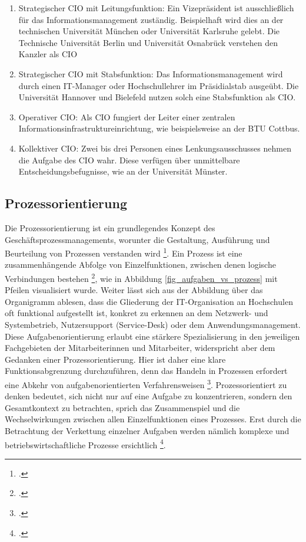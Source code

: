 \begin{enumerate}
    \item Strategischer CIO mit Leitungsfunktion: Ein Vizepräsident ist ausschließlich für das Informationsmanagement zuständig. Beispielhaft wird dies an der technischen Universität München oder Universität Karlsruhe gelebt. Die Technische Universität Berlin und Universität Osnabrück verstehen den Kanzler als CIO
    \item Strategischer CIO mit Stabsfunktion: Das Informationsmanagement wird durch einen IT-Manager oder Hochschullehrer im Präsidialstab ausgeübt. Die Universität Hannover und Bielefeld nutzen solch eine Stabsfunktion als CIO.
    \item Operativer CIO: Als CIO fungiert der Leiter einer zentralen Informationsinfrastruktureinrichtung, wie beispielsweise an der BTU Cottbus.
    \item Kollektiver CIO: Zwei bis drei Personen eines Lenkungsausschusses nehmen die Aufgabe des CIO wahr. Diese verfügen über unmittelbare Entscheidungsbefugnisse, wie an der Universität Münster.
\end{enumerate}


\subsection{Prozessorientierung}
\label{subsection_prozessorientierung}
Die Prozessorientierung ist ein grundlegendes Konzept des Geschäftsprozessmanagements, worunter die Gestaltung, Ausführung und Beurteilung von Prozessen verstanden wird \footcite{Zitat fehlt}. Ein Prozess ist eine zusammenhängende Abfolge von Einzelfunktionen, zwischen denen logische Verbindungen bestehen \footcite{Zitat fehlt}, wie in Abbildung \ref{fig_aufgaben_vs_prozess} mit Pfeilen visualisiert wurde. Weiter lässt sich aus der Abbildung über das Organigramm ablesen, dass die Gliederung der IT-Organisation an Hochschulen oft funktional aufgestellt ist, konkret zu erkennen an dem Netzwerk- und Systembetrieb, Nutzersupport (Service-Desk) oder dem Anwendungsmanagement. Diese Aufgabenorientierung erlaubt eine stärkere Spezialisierung in den jeweiligen Fachgebieten der Mitarbeiterinnen und Mitarbeiter, widerspricht aber dem Gedanken einer Prozessorientierung. Hier ist daher eine klare Funktionsabgrenzung durchzuführen, denn das Handeln in Prozessen erfordert eine Abkehr von aufgabenorientierten Verfahrensweisen \footcite{Zitat fehlt}. Prozessorientiert zu denken bedeutet, sich nicht nur auf eine Aufgabe zu konzentrieren, sondern den Gesamtkontext zu betrachten, sprich das Zusammenspiel und die Wechselwirkungen zwischen allen Einzelfunktionen eines Prozesses. Erst durch die Betrachtung der Verkettung einzelner Aufgaben werden nämlich komplexe und betriebswirtschaftliche Prozesse ersichtlich \footcite{Zitat fehlt}. 

